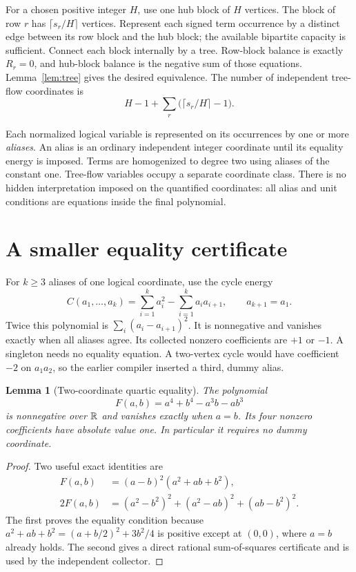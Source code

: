 \documentclass[11pt,letterpaper]{article}
\newtheorem{lemma}[theorem]{Lemma}
\theoremstyle{definition}\newtheorem{definition}[theorem]{Definition}
\theoremstyle{remark}\newtheorem{remark}[theorem]{Remark}
\begin{document}
For a chosen positive integer $H$, use one hub block of $H$ vertices. The
block of row $r$ has $\lceil s_r/H\rceil$ vertices. Represent each signed
term occurrence by a distinct edge between its row block and the hub
block; the available bipartite capacity is sufficient. Connect each block
internally by a tree. Row-block balance is exactly $R_r=0$, and hub-block
balance is the negative sum of those equations. Lemma~\ref{lem:tree} gives
the desired equivalence. The number of independent tree-flow coordinates is
\begin{equation}\label{eq:flow-count}
 H-1+\sum_r\bigl(\lceil s_r/H\rceil-1\bigr).
\end{equation}

Each normalized logical variable is represented on its occurrences by one
or more \emph{aliases}. An alias is an ordinary independent integer
coordinate until its equality energy is imposed. Terms are homogenized to
degree two using aliases of the constant one. Tree-flow variables occupy a
separate coordinate class. There is no hidden interpretation imposed on
the quantified coordinates: all alias and unit conditions are equations
inside the final polynomial.

\section{A smaller equality certificate}
\label{sec:equality}

For $k\geq3$ aliases of one logical coordinate, use the cycle energy
\begin{equation}\label{eq:cycle}
 C(a_1,\ldots,a_k)=\sum_{i=1}^k a_i^2-
                      \sum_{i=1}^k a_i a_{i+1},\qquad a_{k+1}=a_1.
\end{equation}
Twice this polynomial is $\sum_i(a_i-a_{i+1})^2$. It is nonnegative and
vanishes exactly when all aliases agree. Its collected nonzero coefficients
are $+1$ or $-1$. A singleton needs no equality equation. A two-vertex
cycle would have coefficient $-2$ on $a_1a_2$, so the earlier compiler
inserted a third, dummy alias.

\begin{lemma}[Two-coordinate quartic equality]\label{lem:pair}
The polynomial
\begin{equation}\label{eq:pair}
 F(a,b)=a^4+b^4-a^3b-ab^3
\end{equation}
is nonnegative over $\mathbb R$ and vanishes exactly when $a=b$. Its four nonzero
coefficients have absolute value one. In particular it requires no dummy
coordinate.
\end{lemma}
\begin{proof}
Two useful exact identities are
\begin{align*}
 F(a,b)&=(a-b)^2(a^2+ab+b^2),\\
 2F(a,b)&=(a^2-b^2)^2+(a^2-ab)^2+(ab-b^2)^2.
\end{align*}
The first proves the equality condition because
$a^2+ab+b^2=(a+b/2)^2+3b^2/4$ is positive except at $(0,0)$, where
$a=b$ already holds. The second gives a direct rational
sum-of-squares certificate and is used by the independent collector.
\end{proof}
\end{document}
